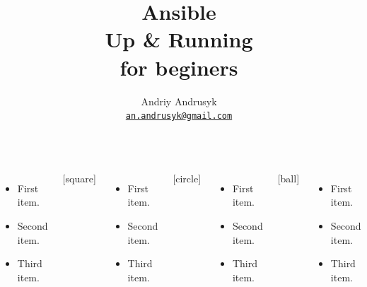 \documentclass[pdf, 8pt, unicode, t]{beamer} %
\title{{\bf Ansible \\
Up \& Running}
\vspace{5mm}\\
\large for beginers
}
\author{\Large Andriy Andrusyk \\ \vspace{2mm} \href{mailto:an.andrusyk@gmail.com}{\normalsize\texttt{an.andrusyk@gmail.com}}}
\begin{document}

\begin{frame}[plain,label=title]
    \titlepage
\end{frame}
\setcounter{framenumber}{0}

\begin{frame}

\begin{columns}
  \begin{itemize}
  \item First item.
  \item Second item.
  \item Third item.
  \end{itemize}
[square]
  \begin{itemize}
  \item First item.
  \item Second item.
  \item Third item.
  \end{itemize}
[circle]
  \begin{itemize}
  \item First item.
  \item Second item.
  \item Third item.
  \end{itemize}
[ball]
  \begin{itemize}
  \item First item.
  \item Second item.
  \item Third item.
  \end{itemize}
\end{columns}

\end{frame}
\end{document}

